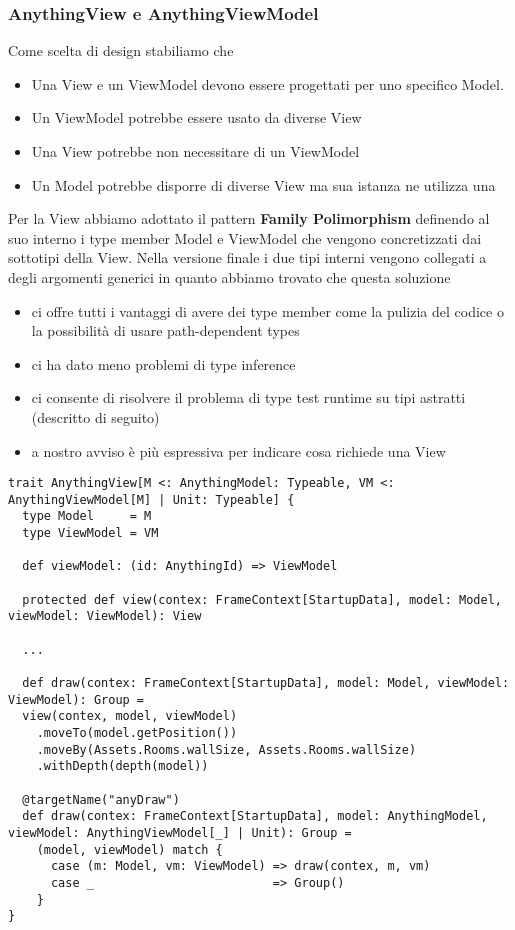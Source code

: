\subsubsection{AnythingView e AnythingViewModel}
Come scelta di design stabiliamo che 
\begin{itemize}
    \item Una View e un ViewModel devono essere progettati per uno specifico Model. 
    \item Un ViewModel potrebbe essere usato da diverse View
    \item Una View potrebbe non necessitare di un ViewModel
    \item Un Model potrebbe disporre di diverse View ma sua istanza ne utilizza una
\end{itemize}
Per la View abbiamo adottato il pattern \textbf{Family Polimorphism} definendo al suo interno i type member Model e ViewModel che vengono concretizzati dai sottotipi della View.
Nella versione finale i due tipi interni vengono collegati a degli argomenti generici in quanto abbiamo trovato che questa soluzione
\begin{itemize}
    \item ci offre tutti i vantaggi di avere dei type member come la pulizia del codice o la possibilità di usare path-dependent types
    \item ci ha dato meno problemi di type inference 
    \item ci consente di risolvere il problema di type test runtime su tipi astratti (descritto di seguito)
    \item a nostro avviso è più espressiva per indicare cosa richiede una View
\end{itemize}

\begin{lstlisting}[basicstyle=\tiny]
trait AnythingView[M <: AnythingModel: Typeable, VM <: AnythingViewModel[M] | Unit: Typeable] {
  type Model     = M
  type ViewModel = VM

  def viewModel: (id: AnythingId) => ViewModel

  protected def view(contex: FrameContext[StartupData], model: Model, viewModel: ViewModel): View
  
  ...

  def draw(contex: FrameContext[StartupData], model: Model, viewModel: ViewModel): Group =
  view(contex, model, viewModel)
    .moveTo(model.getPosition())
    .moveBy(Assets.Rooms.wallSize, Assets.Rooms.wallSize)
    .withDepth(depth(model))

  @targetName("anyDraw")
  def draw(contex: FrameContext[StartupData], model: AnythingModel, viewModel: AnythingViewModel[_] | Unit): Group =
    (model, viewModel) match {
      case (m: Model, vm: ViewModel) => draw(contex, m, vm)
      case _                         => Group()
    }
}
\end{lstlisting}

